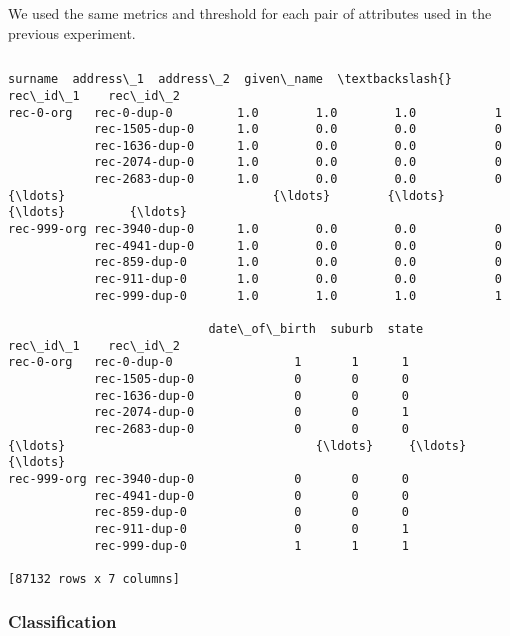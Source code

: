 \documentclass{article}
\begin{document}
We used the same metrics and threshold for each pair of attributes used
in the previous experiment.

    \begin{Verbatim}[commandchars=\\\{\}]

\end{Verbatim}
\begin{Verbatim}[commandchars=\\\{\}]
                            surname  address\_1  address\_2  given\_name  \textbackslash{}
rec\_id\_1    rec\_id\_2                                                    
rec-0-org   rec-0-dup-0         1.0        1.0        1.0           1   
            rec-1505-dup-0      1.0        0.0        0.0           0   
            rec-1636-dup-0      1.0        0.0        0.0           0   
            rec-2074-dup-0      1.0        0.0        0.0           0   
            rec-2683-dup-0      1.0        0.0        0.0           0   
{\ldots}                             {\ldots}        {\ldots}        {\ldots}         {\ldots}   
rec-999-org rec-3940-dup-0      1.0        0.0        0.0           0   
            rec-4941-dup-0      1.0        0.0        0.0           0   
            rec-859-dup-0       1.0        0.0        0.0           0   
            rec-911-dup-0       1.0        0.0        0.0           0   
            rec-999-dup-0       1.0        1.0        1.0           1   

                            date\_of\_birth  suburb  state  
rec\_id\_1    rec\_id\_2                                      
rec-0-org   rec-0-dup-0                 1       1      1  
            rec-1505-dup-0              0       0      0  
            rec-1636-dup-0              0       0      0  
            rec-2074-dup-0              0       0      1  
            rec-2683-dup-0              0       0      0  
{\ldots}                                   {\ldots}     {\ldots}    {\ldots}  
rec-999-org rec-3940-dup-0              0       0      0  
            rec-4941-dup-0              0       0      0  
            rec-859-dup-0               0       0      0  
            rec-911-dup-0               0       0      1  
            rec-999-dup-0               1       1      1  

[87132 rows x 7 columns]
\end{Verbatim}
    \hypertarget{classification}{%
\subsubsection{Classification}\label{classification}}
\end{document}
